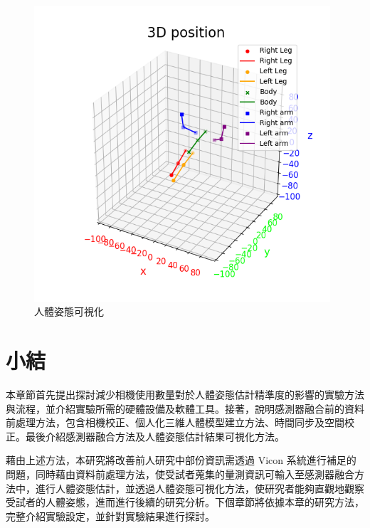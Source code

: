 \begin{figure}[!ht]
   \centering
   \includegraphics[width=11cm]{figure/ch3_fig_posevis.png}
    \caption[人體姿態可視化]{人體姿態可視化}
    \label{ch3_fig_posevis}
\end{figure}

\section{小結}
本章節首先提出探討減少相機使用數量對於人體姿態估計精準度的影響的實驗方法與流程，並介紹實驗所需的硬體設備及軟體工具。接著，說明感測器融合前的資料前處理方法，包含相機校正、個人化三維人體模型建立方法、時間同步及空間校正。最後介紹感測器融合方法及人體姿態估計結果可視化方法。

藉由上述方法，本研究將改善前人研究中部份資訊需透過 Vicon 系統進行補足的問題，同時藉由資料前處理方法，使受試者蒐集的量測資訊可輸入至感測器融合方法中，進行人體姿態估計，並透過人體姿態可視化方法，使研究者能夠直觀地觀察受試者的人體姿態，進而進行後續的研究分析。下個章節將依據本章的研究方法，完整介紹實驗設定，並針對實驗結果進行探討。
\clearpage